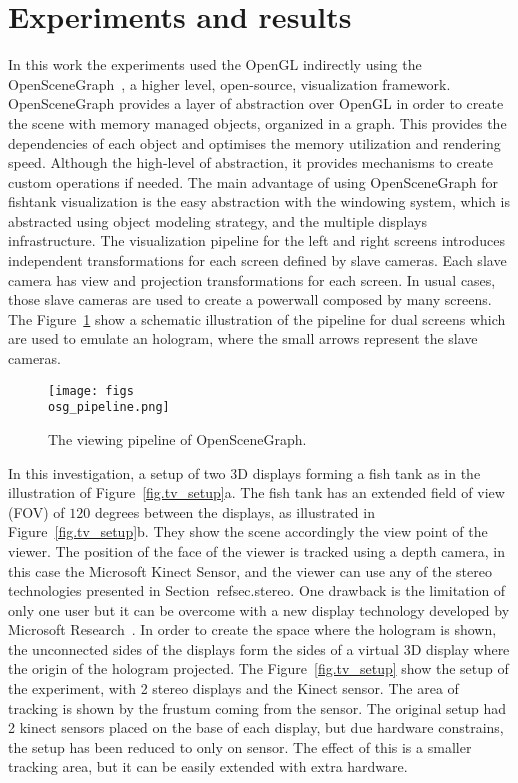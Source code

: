 \section{Experiments and results}
\label{sec.results}

In this work the experiments used the OpenGL indirectly using the OpenSceneGraph~\cite{Burns2004}, a higher level, open-source, visualization framework. OpenSceneGraph provides a layer of abstraction over OpenGL in order to create the scene with memory managed objects, organized in a graph. This provides the dependencies of each object and optimises the memory utilization and rendering speed. Although the high-level of abstraction, it provides mechanisms to create custom operations if needed. The main advantage of using OpenSceneGraph for fishtank visualization is the easy abstraction with the windowing system, which is abstracted using object modeling strategy, and the multiple displays infrastructure. The visualization pipeline for the left and right screens introduces independent transformations for each screen defined by slave cameras. Each slave camera has view and projection transformations for each screen. In usual cases, those slave cameras are used to create a powerwall composed by many screens. The Figure~\ref{fig.osg_pipeline} show a schematic illustration of the pipeline for dual screens which are used to emulate an hologram, where the small arrows represent the slave cameras.

\begin{figure}[!hb]
\centering
\texttt{[image: figs\\osg\_pipeline.png]}
\caption{The viewing pipeline of OpenSceneGraph.}
\label{fig.osg_pipeline}
\end{figure}

In this investigation, a setup of two 3D displays forming a fish tank as in the illustration of Figure~\ref{fig.tv_setup}a. The fish tank has an extended field of view (FOV) of $120$ degrees between the displays, as illustrated in Figure~\ref{fig.tv_setup}b. They show the scene accordingly the view point of the viewer. The  position of the face of the viewer is tracked using a depth camera, in this case the Microsoft Kinect Sensor, and the viewer can use any of the stereo technologies presented in Section~ref{sec.stereo}. One drawback is the limitation of only one user but it can be overcome with a new display technology developed by Microsoft Research~\cite{Harris2010}. In order to create the space where the hologram is shown, the unconnected sides of the displays form the sides of a virtual 3D display where the origin of the hologram projected. The Figure~\ref{fig.tv_setup} show the setup of the experiment, with 2 stereo displays and the Kinect sensor. The area of tracking is shown by the frustum coming from the sensor. The original setup had 2 kinect sensors placed on the base of each display, but due hardware constrains, the setup has been reduced to only on sensor. The effect of this is a smaller tracking area, but it can be easily extended with extra hardware.

